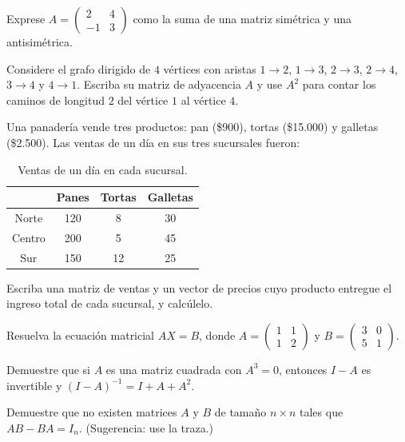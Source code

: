 \begin{prob}
Exprese $A=\begin{pmatrix}2&4\\-1&3\end{pmatrix}$ como la suma de una matriz simétrica y una antisimétrica.
\end{prob}

\begin{prob}
Considere el grafo dirigido de $4$ vértices con aristas $1\to 2$, $1\to 3$, $2\to 3$, $2\to 4$, $3\to 4$ y $4\to 1$. Escriba su matriz de adyacencia $A$ y use $A^{2}$ para contar los caminos de longitud $2$ del vértice $1$ al vértice $4$.
\end{prob}

\begin{prob}
Una panadería vende tres productos: pan (\$900), tortas (\$15.000) y galletas (\$2.500). Las ventas de un día en sus tres sucursales fueron:

\begin{table}[H]\centering
\begin{tabular}{|c||c|c|c|}\hline
& Panes & Tortas & Galletas\\\hline
Norte & 120 & 8 & 30\\
Centro & 200 & 5 & 45\\
Sur & 150 & 12 & 25\\\hline
\end{tabular}
\caption{Ventas de un día en cada sucursal.}
\end{table}

Escriba una matriz de ventas y un vector de precios cuyo producto entregue el ingreso total de cada sucursal, y calcúlelo.
\end{prob}

\begin{prob}
Resuelva la ecuación matricial $AX=B$, donde $A=\begin{pmatrix}1&1\\1&2\end{pmatrix}$ y $B=\begin{pmatrix}3&0\\5&1\end{pmatrix}$.
\end{prob}

\begin{prob}
Demuestre que si $A$ es una matriz cuadrada con $A^{3}=0$, entonces $I-A$ es invertible y $(I-A)^{-1}=I+A+A^{2}$.
\end{prob}

\begin{prob}
Demuestre que no existen matrices $A$ y $B$ de tamaño $n\times n$ tales que $AB-BA=I_{n}$. (Sugerencia: use la traza.)
\end{prob}

